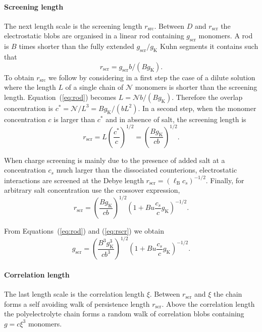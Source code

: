 \documentclass[journal=jacsat,manuscript=article]{achemso}
\begin{document}
\paragraph{Screening length}
The next length scale is the screening length $r_\mathrm{src}$. Between $D$ and $r_\mathrm{scr}$ the electrostatic blobs are organised in a linear rod containing $g_\mathrm{scr}$ monomers. A rod is $B$ times shorter than the fully extended $g_\mathrm{scr}/g_\mathrm{K}$ Kuhn segments it contains such that
\begin{equation}
r_\mathrm{scr}= g_\mathrm{scr} b / (B g_\mathrm{K}).
\label{eq:rod}
\end{equation}
To obtain $r_\mathrm{src}$ we follow \cite{Dobrynin1995} by considering in a first step the case of a dilute solution where the length $L$ of a single chain of $\mathcal{N}$ monomers is shorter than the screening length. Equation~(\ref{eq:rod}) becomes $L= \mathcal{N} b / (B g_\mathrm{K})$. Therefore the overlap concentration is $c^* = \mathcal{N}/L^3 = B g_\mathrm{K} / (b L^2)$. In a second step, when the monomer concentration $c$ is larger than $c^*$ and in absence of salt, the screening length is
\begin{equation}
r_\mathrm{scr} = L \left(\frac{c^*}{c}\right)^{1/2} =  \left(\frac{B g_\mathrm{K}}{cb}\right)^{1/2}.
\label{eq:rscrNoSalt}
\end{equation}

When charge screening is mainly due to the presence of added salt at a concentration $c_s$ much larger than the dissociated counterions, electrostatic interactions are screened at the Debye length $r_\mathrm{scr} = \left(\ell_\mathrm{B} c_s\right)^{-1/2}$. Finally, for arbitrary salt concentration \citet{Dobrynin1995} use the crossover expression,
\begin{equation}
r_\mathrm{scr} = \left(\frac{B g_\mathrm{K}}{cb}\right)^{1/2} \left(1+ B u \frac{c_s}{c} g_\mathrm{K}\right)^{-1/2}.
\label{eq:rscr}
\end{equation}

From Equations~(\ref{eq:rod}) and (\ref{eq:rscr}) we obtain
\begin{equation}
g_\mathrm{scr} = \left(\frac{B^3 g_\mathrm{K}^3}{cb^3}\right)^{1/2} \left(1 + B u \frac{c_s}{c} g_\mathrm{K}\right)^{-1/2}.
\label{eq:gscr}
\end{equation}

\paragraph{Correlation length}
The last length scale is the correlation length $\xi$. Between $r_\mathrm{scr}$ and $\xi$ the chain forms a self avoiding walk of persistence length $r_\mathrm{scr}$. Above the correlation length the polyelectrolyte chain forms a random walk of correlation blobs containing $g=c\xi^3$ monomers.
\end{document}
